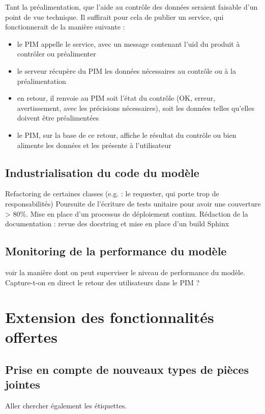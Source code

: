             Tant la préalimentation, que l'aide au contrôle des données seraient faisable d'un point de vue technique.
            Il suffirait pour cela de publier un service, qui fonctionnerait de la manière suivante : 
            \begin{itemize}
                \item le PIM appelle le service, avec un message contenant l'uid du produit à contrôler ou préalimenter
                \item le serveur récupère du PIM les données nécessaires au contrôle ou à la préalimentation
                \item en retour, il renvoie au PIM soit l'état du contrôle (OK, erreur, avertissement, avec les précisions nécessaires), soit les données telles qu'elles doivent être préalimentées
                \item le PIM, sur la base de ce retour, affiche le résultat du contrôle ou bien alimente les données et les présente à l'utilisateur
            \end{itemize}

        \section{Industrialisation du code du modèle}
        Refactoring de certaines classes (e.g. : le requester, qui porte trop de responsabilités)
        Poursuite de l'écriture de tests unitaire pour avoir une couverture > 80\%.
        Mise en place d'un processus de déploiement continu.
        Rédaction de la documentation : revue des docstring et mise en place d'un build Sphinx

        \section{Monitoring de la performance du modèle}
        voir la manière dont on peut superviser le niveau de performance du modèle.
        Capture-t-on en direct le retour des utilisateurs dans le PIM ?

    \chapter{Extension des fonctionnalités offertes}
        \section{Prise en compte de nouveaux types de pièces jointes}
        Aller chercher également les étiquettes.

